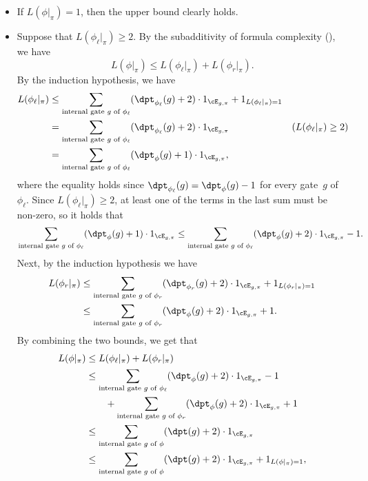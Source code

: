 \documentclass{toc}
\begin{document}
\begin{itemize}
\item If $L(\phi|_{\pi})=1$, then the upper bound clearly holds. 
\item Suppose that $L(\phi_{\ell}|_{\pi})\ge2$. By the subadditivity of
formula complexity (), we have 
\[
L(\phi|_{\pi})\le L(\phi_{\ell}|_{\pi})+L(\phi_{r}|_{\pi}).
\]
By the induction hypothesis, we have 
\begin{align*}
L(\phi_{\ell}|_{\pi}) & \le\sum_{\text{internal gate }g\text{ of }\phi_{\ell}}(\dpt_{\phi_{\ell}}(g)+2)\cdot1_{\cE_{g,\pi}}+1_{L(\phi_{\ell}|_{\pi})=1}\\
 & =\sum_{\text{internal gate }g\text{ of }\phi_{\ell}}(\dpt_{\phi_{\ell}}(g)+2)\cdot1_{\cE_{g,\pi}} & (L(\phi_{\ell}|_{\pi})\ge2)\\
 & =\sum_{\text{internal gate }g\text{ of }\phi_{\ell}}(\dpt_{\phi}(g)+1)\cdot1_{\cE_{g,\pi}},
\end{align*}
where the equality holds since $\dpt_{\phi_{\ell}}(g)=\dpt_{\phi}(g)-1$
for every gate~$g$ of $\phi_{\ell}$. Since $L(\phi_{\ell}|_{\pi})\ge2$,
at least one of the terms in the last sum must be non-zero, so it
holds that 
\[
\sum_{\text{internal gate }g\text{ of }\phi_{\ell}}(\dpt_{\phi}(g)+1)\cdot1_{\cE_{g,\pi}}\le\sum_{\text{internal gate }g\text{ of }\phi_{\ell}}(\dpt_{\phi}(g)+2)\cdot1_{\cE_{g,\pi}}-1.
\]
Next, by the induction hypothesis we have 
\begin{align*}
L(\phi_{r}|_{\pi}) & \le\sum_{\text{internal gate }g\text{ of }\phi_{r}}(\dpt_{\phi_{r}}(g)+2)\cdot1_{\cE_{g,\pi}}+1_{L(\phi_{r}|_{\pi})=1}\\
 & \le\sum_{\text{internal gate }g\text{ of }\phi_{r}}(\dpt_{\phi}(g)+2)\cdot1_{\cE_{g,\pi}}+1.
\end{align*}
By combining the two bounds, we get that 
\begin{align*}
L(\phi|_{\pi}) & \le L(\phi_{\ell}|_{\pi})+L(\phi_{r}|_{\pi})\\
 & \le\sum_{\text{internal gate }g\text{ of }\phi_{\ell}}(\dpt_{\phi}(g)+2)\cdot1_{\cE_{g,\pi}}-1\\
 & \qquad+\sum_{\text{internal gate }g\text{ of }\phi_{r}}(\dpt_{\phi}(g)+2)\cdot1_{\cE_{g,\pi}}+1\\
 & \le\sum_{\text{internal gate }g\text{ of }\phi}(\dpt(g)+2)\cdot1_{\cE_{g,\pi}}\\
 & \le\sum_{\text{internal gate }g\text{ of }\phi}(\dpt(g)+2)\cdot1_{\cE_{g,\pi}}+1_{L(\phi|_{\pi})=1},
\end{align*}

\end{itemize}
\end{document}
